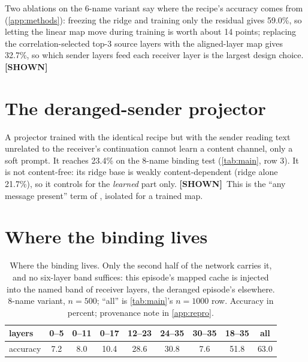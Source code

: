 \documentclass[11pt,a4paper]{report}
\newcommand{\SHOWN}{\textcolor{shownc}{\textbf{\scriptsize[SHOWN]}}}
\begin{document}
Two ablations on the 6-name variant say where the recipe's accuracy comes from (\cref{app:methods}): freezing the ridge and training only the residual gives 59.0\%, so letting the linear map move during training is worth about 14 points; replacing the correlation-selected top-3 source layers with the aligned-layer map gives 32.7\%, so which sender layers feed each receiver layer is the largest design choice. \SHOWN

\section{The deranged-sender projector}

A projector trained with the identical recipe but with the sender reading text unrelated to the receiver's continuation cannot learn a content channel, only a soft prompt. It reaches 23.4\% on the 8-name binding test (\cref{tab:main}, row 3). It is not content-free: its ridge base is weakly content-dependent (ridge alone 21.7\%), so it controls for the \emph{learned} part only. \SHOWN\ This is the ``any message present'' term of \citet{2607.26773}, isolated for a trained map.

\section{Where the binding lives}

\begin{table}[h]
\caption{Where the binding lives. Only the second half of the network carries it, and no six-layer band suffices: this episode's mapped cache is injected into the named band of receiver layers, the deranged episode's elsewhere. 8-name variant, $n = 500$; ``all'' is \cref{tab:main}'s $n = 1000$ row. Accuracy in percent; provenance note in \cref{app:repro}.}
\label{tab:layers}
\vskip 0.1in
\begin{center}
\begin{footnotesize}
\begin{tabular}{lcccccccc}
\toprule
layers   & 0--5 & 0--11 & 0--17 & 12--23 & 24--35 & 30--35 & 18--35 & all \\
\midrule
accuracy & 7.2 & 8.0 & 10.4 & 28.6 & 30.8 & 7.6 & 51.8 & 63.0 \\
\bottomrule
\end{tabular}
\end{footnotesize}
\end{center}
\vskip -0.1in
\end{table}
\end{document}

